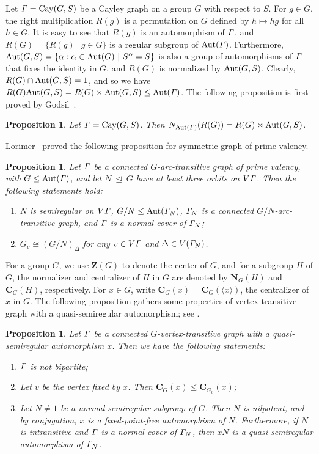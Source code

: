 \documentclass[12pt,reqno]{amsart}
\def\C{\mathbf{C}}   \newcommand\Cay{\mathrm{Cay}}   \newcommand\Cos{\mathrm{Cos}} \newcommand{\CGammaSp}{\mathrm{C\Gamma Sp}}
\newcommand\N{\mathbf{N}}
\newcommand\Z{\mathbf{Z}} \newcommand\ZZ{\mathbb{Z}}
\numberwithin {equation} {section}
\newtheorem{proposition}[theorem]{Proposition}
\begin{document}
Let $\Ga=\Cay(G,S)$ be a Cayley graph on a group $G$ with respect to $S$. For $g\in G$,
the right multiplication $R(g)$ is a permutation on $G$ defined by $h\mapsto hg$ for all $h\in G$. It is easy to see that $R(g)$ is an automorphism of ${\it \Gamma}$, and $R(G)=\{R(g)\ |\ g \in G \}$ is a regular subgroup of $\mathrm{Aut}({\it \Gamma})$. Furthermore, $\mathrm{Aut}(G,S)=\{\alpha:\alpha \in \mathrm{Aut}(G)\ | \ S^\alpha=S \}$ is also a group of automorphisms of ${\it \Gamma}$ that fixes the identity in $G$, and $R(G)$ is normalized by $\mathrm{Aut}(G,S)$. Clearly, $R(G)\cap \mathrm{Aut}(G,S)=1$, and so we have  $R(G)\mathrm{Aut}(G,S)=R(G)\rtimes\mathrm{Aut}(G,S)\leq \mathrm{Aut}({\it \Gamma})$. The following proposition is first proved by Godsil~\cite{Godsil}.

\begin{proposition} \label{pro:Cayley}
Let $\Ga=\Cay(G,S)$. Then $N_{\mathrm{Aut}({\it \Gamma})}(R(G))=R(G)\rtimes\mathrm{Aut}(G,S)$.
\end{proposition}

Lorimer~\cite{Lor} proved the following proposition for symmetric graph of prime valency.

\begin{proposition}\label{pro:normalquo}
Let ${\it \Gamma} $ be a connected $G$-arc-transitive graph of prime valency, with $G\leq \mathrm{Aut}({\it \Gamma})$, and let $N ~ \unlhd~ G$ have at least three orbits on $V{\it \Gamma} $. Then the following statements hold:
\begin{enumerate}[\rm (1)]
\item  $N$ is semiregular on $V{\it \Gamma} $, $G/N \leq \mathrm{Aut}({\it \Gamma} _N)$, ${\it \Gamma} _N$ is a connected $G/N$-arc-transitive graph, and ${\it \Gamma} $ is a normal cover of ${\it \Gamma} _N$;
\item  $G_v \cong (G/N)_{\Delta}$ for any $v \in V{\it \Gamma} $ and $\Delta \in V({\it \Gamma}_N)$.
\end{enumerate}

\end{proposition}


For a group $G$, we use $\Z(G)$ to denote the center of $G$, and for a subgroup $H$ of $G$, the normalizer and centralizer of $H$  in $G$ are denoted by $\N_G(H)$ and $\C_G(H)$, respectively. For $x \in G$, write $\C_G(x)=\C_G(\langle x\rangle)$, the centralizer of $x$ in $G$. The following  proposition gathers some properties of vertex-transitive graph with a quasi-semiregular automorphism; see \cite[Lemmas 2.1, 2.4 and 2.5]{FengHKKM}.

\begin{proposition} \label{pro:qsprop}
Let ${\it \Gamma}$ be a connected $G$-vertex-transitive graph with a quasi-semiregular automorphism $x$. Then we have the following statements:
\begin{enumerate}[\rm (1)]
\item ${\it \Gamma}$ is not bipartite;
\item Let $v$ be the vertex fixed by $x$. Then $\C_G(x)\leq \C_{G_v}(x)$;
\item Let $N \neq 1$ be a normal semiregular subgroup of $G$. Then $N$ is nilpotent, and by conjugation, $x$ is a fixed-point-free automorphism of $N$. Furthermore, if $N$ is intransitive and ${\it \Gamma}$ is a normal cover of ${\it \Gamma}_N$, then $xN$ is a quasi-semiregular automorphism of ${\it \Gamma}_N$.
\end{enumerate}
\end{proposition}
\end{document}
